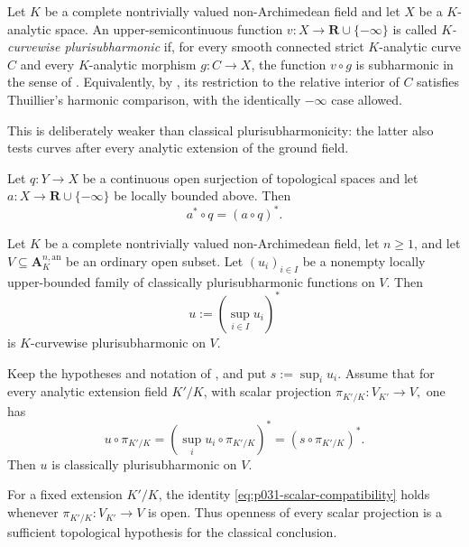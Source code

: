 
\begin{definition}
\label{def:p031-ground-field-curvewise-psh}
Let $K$ be a complete nontrivially valued non-Archimedean field and let
$X$ be a $K$-analytic space.  An upper-semicontinuous function
$v:X\to\mathbf R\cup\{-\infty\}$ is called
\emph{$K$-curvewise plurisubharmonic} if, for every smooth connected
strict $K$-analytic curve $C$ and every $K$-analytic morphism
$g:C\to X$, the function $v\circ g$ is subharmonic in the sense of
\cite[Definition~3.4]{GR25Classical}.  Equivalently, by
\cite[\S3.4.1]{GR25Classical}, its restriction to the relative interior of
$C$ satisfies Thuillier's harmonic comparison, with the identically
$-\infty$ case allowed.

This is deliberately weaker than classical plurisubharmonicity: the latter
also tests curves after every analytic extension of the ground field.
\end{definition}

\begin{lemma}
\label{lem:p031-open-pullback-usc}
Let $q:Y\to X$ be a continuous open surjection of topological spaces and
let $a:X\to\mathbf R\cup\{-\infty\}$ be locally bounded above.  Then
\[
                         a^*\circ q=(a\circ q)^*.
\]
\end{lemma}

\begin{theorem}
\label{thm:p031-affine-ground-field-perron}
Let $K$ be a complete nontrivially valued non-Archimedean field, let
$n\geq 1$, and let $V\subseteq\mathbf A_K^{n,\mathrm{an}}$ be an
ordinary open subset.  Let $(u_i)_{i\in I}$ be a nonempty locally
upper-bounded family of classically plurisubharmonic functions on $V$.
Then
\[
                   u:=\left(\sup_{i\in I}u_i\right)^*
\]
is $K$-curvewise plurisubharmonic on $V$.
\end{theorem}

\begin{corollary}
\label{cor:p031-scalar-compatibility-upgrade}
Keep the hypotheses and notation of
, and put
$s:=\sup_i u_i$.  Assume that for every analytic extension field
$K'/K$, with scalar projection
$
 \pi_{K'/K}:V_{K'}\to V,
$
one has
\begin{equation}
\label{eq:p031-scalar-compatibility}
 u\circ\pi_{K'/K}
       =\left(\sup_i u_i\circ\pi_{K'/K}\right)^*
       =(s\circ\pi_{K'/K})^*.
\end{equation}
Then $u$ is classically plurisubharmonic on $V$.

For a fixed extension $K'/K$, the identity
\eqref{eq:p031-scalar-compatibility} holds whenever
$
 \pi_{K'/K}:V_{K'}\to V
$
is open.  Thus openness of every scalar projection is a sufficient
topological hypothesis for the classical conclusion.
\end{corollary}

